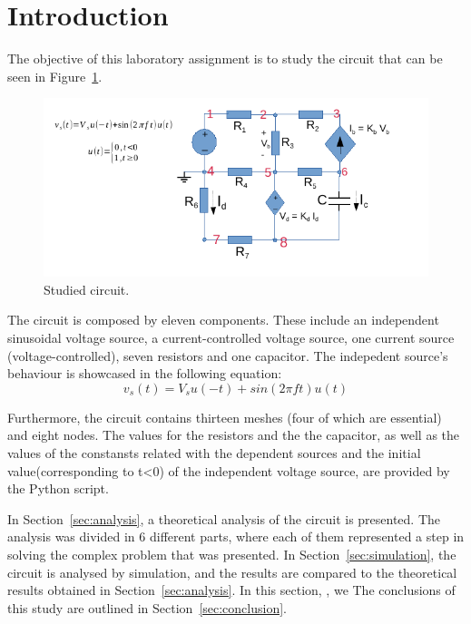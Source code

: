 \section{Introduction}
\label{sec:introduction}

The objective of this laboratory assignment is to study the circuit that can be seen in Figure~\ref{fig:T2Circuit}.

\vspace{4.0cm}

\begin{figure}[h] \centering
\includegraphics[width=0.8\linewidth]{T2Circuit.pdf}
\caption{Studied circuit.}
\label{fig:T2Circuit}
\end{figure}
 
The circuit is composed by eleven components. These include an independent sinusoidal voltage source, a current-controlled voltage source, one current source (voltage-controlled), seven resistors and one capacitor.
The indepedent source's behaviour is showcased in the following equation:
\begin {equation}
   v_s(t)= V_s u(-t) + sin(2\pi f t)u(t)
   \end {equation}
   
 Furthermore, the circuit contains thirteen meshes (four of which are essential) and eight nodes.
The values for the resistors and the the capacitor, as well as the values of the constansts related with the dependent sources and the initial value(corresponding to t<0) of the independent voltage source, are provided by the Python script.

In Section~\ref{sec:analysis}, a theoretical analysis of the circuit is
presented. The analysis was divided in 6 different parts, where each of them represented a step in solving the complex problem that was presented. In Section~\ref{sec:simulation}, the circuit is analysed by
simulation, and the results are compared to the theoretical results obtained in Section~\ref{sec:analysis}. In this section, , we  The conclusions of this study are outlined in
Section~\ref{sec:conclusion}.


